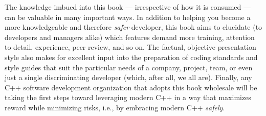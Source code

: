 The knowledge imbued into this book --- irrespective of how it is consumed --- can be valuable in many important ways. In addition to helping you become a more knowledgeable and therefore \textit{safer} developer, this book aims to elucidate (to developers and managers alike) which features demand more training, attention to detail, experience, peer review, and so on. The factual, objective presentation style also makes for excellent input into the preparation of coding standards and style guides that suit the particular needs of a company, project, team, or even just a single discriminating developer (which, after all, we all are). Finally, any C++ software development organization that adopts this book wholesale will be taking the first steps toward leveraging modern C++ in a way that maximizes reward while minimizing risks, i.e., by embracing modern C++ \textit{safely}.

